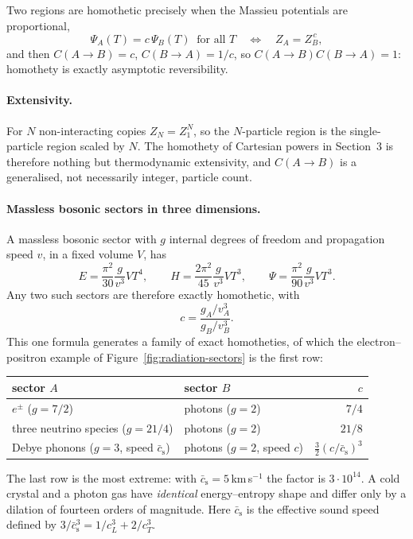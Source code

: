 \documentclass[11pt]{article}
\theoremstyle{definition}
\theoremstyle{remark}
\begin{document}
Two regions are homothetic precisely when the Massieu potentials are
proportional,
\[
  \Psi_A(T)=c\,\Psi_B(T)\ \text{ for all }T
  \quad\Longleftrightarrow\quad
  Z_A=Z_B^{\,c},
\]
and then \(C(A\to B)=c\), \(C(B\to A)=1/c\), so
\(C(A\to B)C(B\to A)=1\): homothety is exactly asymptotic reversibility.

\paragraph{Extensivity.}
For \(N\) non-interacting copies \(Z_N=Z_1^N\), so the \(N\)-particle region is
the single-particle region scaled by \(N\).  The homothety of Cartesian powers
in Section~3 is therefore nothing but thermodynamic extensivity, and
\(C(A\to B)\) is a generalised, not necessarily integer, particle count.

\paragraph{Massless bosonic sectors in three dimensions.}
A massless bosonic sector with \(g\) internal degrees of freedom and
propagation speed \(v\), in a fixed volume \(V\), has
\[
  E=\frac{\pi^2}{30}\frac{g}{v^3}VT^4,\qquad
  H=\frac{2\pi^2}{45}\frac{g}{v^3}VT^3,\qquad
  \Psi=\frac{\pi^2}{90}\frac{g}{v^3}VT^3 .
\]
Any two such sectors are therefore exactly homothetic, with
\begin{equation}
  \label{eq:massless-homothety}
  c=\frac{g_A/v_A^3}{g_B/v_B^3}.
\end{equation}
This one formula generates a family of exact homotheties, of which the
electron--positron example of Figure~\ref{fig:radiation-sectors} is the first
row:
\begin{center}
\begin{tabular}{@{}llr@{}}
  \toprule
  sector \(A\) & sector \(B\) & \(c\) \\
  \midrule
  \(e^\pm\) (\(g=7/2\)) & photons (\(g=2\)) & \(7/4\) \\
  three neutrino species (\(g=21/4\)) & photons (\(g=2\)) & \(21/8\) \\
  Debye phonons (\(g=3\), speed \(\bar c_{\mathrm s}\))
    & photons (\(g=2\), speed \(c\))
    & \(\tfrac32(c/\bar c_{\mathrm s})^3\) \\
  \bottomrule
\end{tabular}
\end{center}
The last row is the most extreme: with \(\bar c_{\mathrm s}=5\,\)km\,s\(^{-1}\)
the factor is \(3\cdot10^{14}\).  A cold crystal and a photon gas have
\emph{identical} energy--entropy shape and differ only by a dilation of
fourteen orders of magnitude.  Here \(\bar c_{\mathrm s}\) is the effective
sound speed defined by
\(3/\bar c_{\mathrm s}^3=1/c_L^3+2/c_T^3\).
\end{document}
